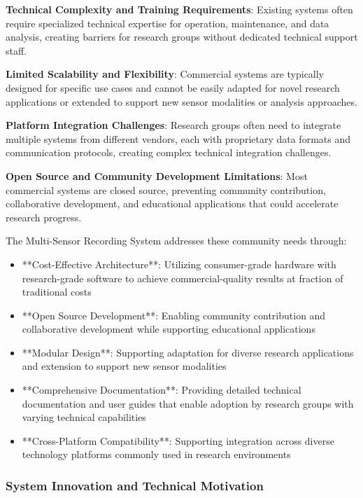 \documentclass[12pt,a4paper]{report}
\begin{document}
\textbf{Technical Complexity and Training Requirements}: Existing systems often require specialized technical expertise for
operation, maintenance, and data analysis, creating barriers for research groups without dedicated technical support
staff.

\textbf{Limited Scalability and Flexibility}: Commercial systems are typically designed for specific use cases and cannot be
easily adapted for novel research applications or extended to support new sensor modalities or analysis approaches.

\textbf{Platform Integration Challenges}: Research groups often need to integrate multiple systems from different vendors,
each with proprietary data formats and communication protocols, creating complex technical integration challenges.

\textbf{Open Source and Community Development Limitations}: Most commercial systems are closed source, preventing community
contribution, collaborative development, and educational applications that could accelerate research progress.

The Multi-Sensor Recording System addresses these community needs through:

\begin{itemize}
\item **Cost-Effective Architecture**: Utilizing consumer-grade hardware with research-grade software to achieve
  commercial-quality results at fraction of traditional costs
\item **Open Source Development**: Enabling community contribution and collaborative development while supporting
  educational applications
\item **Modular Design**: Supporting adaptation for diverse research applications and extension to support new sensor
  modalities
\item **Comprehensive Documentation**: Providing detailed technical documentation and user guides that enable adoption by
  research groups with varying technical capabilities
\item **Cross-Platform Compatibility**: Supporting integration across diverse technology platforms commonly used in research
  environments

\end{itemize}
\subsubsection{System Innovation and Technical Motivation}
\end{document}
